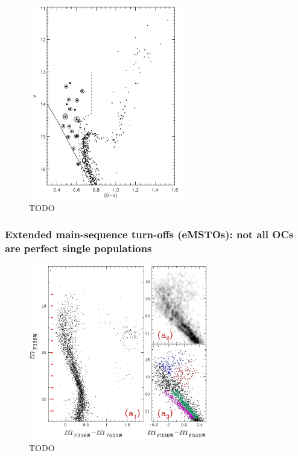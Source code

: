 \begin{figure}[tb]
	\centering
	\includegraphics[width=0.6\textwidth]{fig/c1/ngc_188_blue_stragglers.png}
	\caption[TODO]{TODO}
	\label{fig:intro:history:blue_stragglers}
\end{figure}

\subsubsection{Extended main-sequence turn-offs (eMSTOs): not all OCs are perfect single populations}

\begin{figure}[tb]
	\centering
	\includegraphics[width=0.7\textwidth]{fig/c1/emsto.png}
	\caption[TODO]{TODO}
	\label{fig:intro:history:emsto}
\end{figure}

